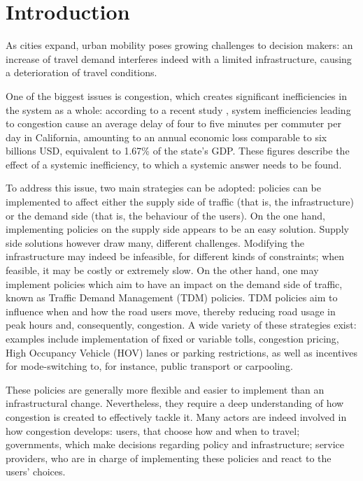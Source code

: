 \documentclass{article}
\begin{document}
\section{Introduction}
\label{sec:intro}

As cities expand,
urban mobility poses growing challenges to decision makers:
an increase of travel demand interferes indeed with a limited infrastructure,
causing a deterioration of travel conditions.

One of the biggest issues is congestion,
which creates significant inefficiencies in the system as a whole:
according to a recent study \parencite{kim2022congestion},
system inefficiencies leading to congestion
cause an average delay of four to five minutes per commuter per day in California,
amounting to an annual economic loss comparable to six billions USD,
equivalent to 1.67\% of the state's GDP.
These figures describe the effect of a systemic inefficiency,
to which a systemic answer needs to be found.

To address this issue, two main strategies can be adopted:
policies can be implemented to affect either the supply side of traffic (that is, the infrastructure)
or the demand side (that is, the behaviour of the users).
On the one hand, implementing policies on the supply side appears to be an easy solution.
Supply side solutions however draw many, different challenges.
Modifying the infrastructure may indeed be infeasible, for different kinds of constraints;
when feasible, it may be costly or extremely slow.
On the other hand,
one may implement policies which aim to have an impact on the demand side of traffic,
known as Traffic Demand Management (TDM) policies.
TDM policies aim to influence when and how the road users move,
thereby reducing road usage in peak hours and,
consequently, congestion.
A wide variety of these strategies exist:
examples include implementation of fixed or variable tolls,
congestion pricing, High Occupancy Vehicle (HOV) lanes or parking restrictions,
as well as incentives for mode-switching to,
for instance, public transport or carpooling.

These policies are generally more flexible and easier to implement
than an infrastructural change.
Nevertheless, they require a deep understanding of how congestion is created
to effectively tackle it.
Many actors are indeed involved in how congestion develops:
users, that choose how and when to travel;
governments, which make decisions regarding policy and infrastructure;
service providers, who are in charge of implementing these policies and react to the users' choices.
\end{document}

